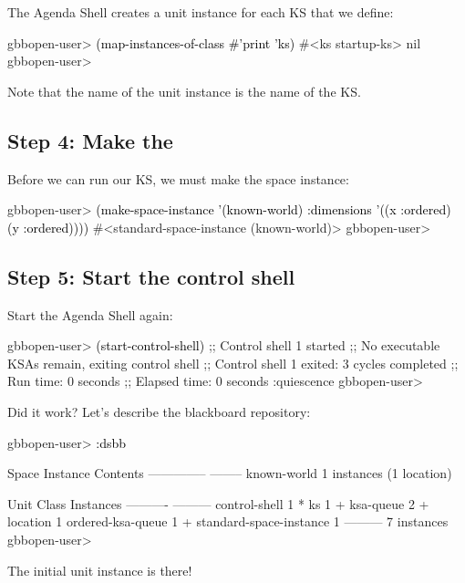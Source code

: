 \documentclass[10pt,twoside,english,pdftex]{article}
\begin{document}
The Agenda Shell creates a  unit instance for each KS that we
define:
%
\W\supp
\begin{example}
\textcolor{darkergray}{%
  gbbopen-user> \textcolor{black}{(map-instances-of-class #'print 'ks)}
  #<ks startup-ks> 
  nil
  gbbopen-user>}
\end{example}
%
Note that the name of the  unit instance is the name of the KS.

\subsection*{Step 4: Make the }

Before we can run our KS, we must make the  space
instance:
%
\W\supp
\begin{example}
\textcolor{darkergray}{%
  gbbopen-user> \textcolor{black}{(make-space-instance '(known-world)
                          :dimensions '((x :ordered) (y :ordered))))}
  #<standard-space-instance (known-world)>
  gbbopen-user>}
\end{example}

\subsection*{Step 5: Start the control shell}

%
%
Start the Agenda Shell again:
%
\W\supp
\begin{example}
\textcolor{darkergray}{%
  gbbopen-user> \textcolor{black}{(start-control-shell)}
  ;; Control shell 1 started
  ;; No executable KSAs remain, exiting control shell
  ;; Control shell 1 exited: 3 cycles completed
  ;; Run time: 0 seconds
  ;; Elapsed time: 0 seconds
  :quiescence
  gbbopen-user>}
\end{example}

Did it work?  Let's describe the blackboard repository:
%
\W\supp
\begin{example}
\textcolor{darkergray}{%
  gbbopen-user> \textcolor{black}{:dsbb}
  
  Space Instance                Contents
  --------------                --------
  known-world                   1 instances (1 location)

  Unit Class                    Instances
  ----------                    ---------
  control-shell                         1 *
  ks                                    1 +
  ksa-queue                             2 +
  location                              1
  ordered-ksa-queue                     1 +
  standard-space-instance               1
                                ---------
                                        7 instances
  gbbopen-user>}
\end{example}
%
The initial  unit instance is there!
\end{document}
